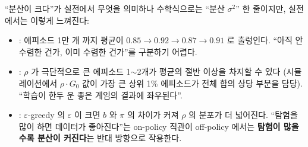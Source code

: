 \begin{frame}{``분산이 크다''가 실전에서 무엇을 의미하나}
  수학식으로는 ``분산 $\sigma^2$'' 한 줄이지만, 실전에서는
  이렇게 느껴진다:
  \begin{itemize}
    \item {}: 에피소드 1만 개
     까지 평균이 $0.85 \to 0.92 \to 0.87 \to 0.91$ 로
      출렁인다. ``아직 안 수렴한 건가, 이미 수렴한 건가''를
      구분하기 어렵다.
    \item {}: $\rho$ 가
      극단적으로 큰 에피소드 1$\sim$2개가 평균의 절반 이상을
      차지할 수 있다 (시뮬레이션에서 $\rho \cdot G_0$ 값이
      가장 큰 상위 1\% 에피소드가 전체 합의 상당 부분을
      담당). ``학습이 한두 운 좋은 게임의 결과에 좌우된다''.
    \item {}:
      $\varepsilon$-greedy 의 $\varepsilon$ 이 크면 $b$ 와
      $\pi$ 의 차이가 커져 $\rho$ 의 분포가 더 넓어진다.
      ``탐험을 많이 하면 데이터가 좋아진다''는 on-policy
      직관이 off-policy 에서는 \textbf{탐험이 많을수록
      분산이 커진다}는 반대 방향으로 작용한다.
  \end{itemize}
\end{frame}
